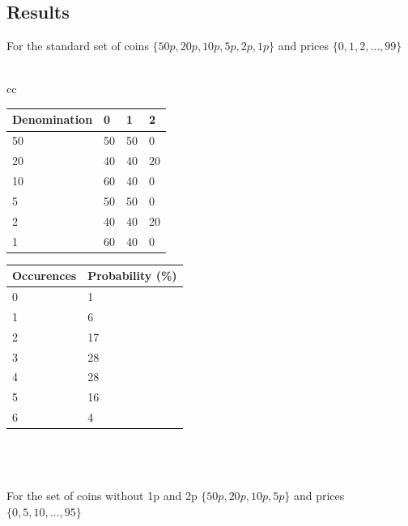 \documentclass{article}
\begin{document}
\subsection{Results}
For the standard set of coins $ \{50p, 20p, 10p, 5p, 2p, 1p \} $ and prices $ \{0, 1, 2, \ldots, 99 \} $
\\ \\
\begin{tabular}{cc}

    \begin{tabular}[t]{llll}
        Denomination & 0  & 1  & 2  \\
        \hline
        50           & 50 & 50 & 0  \\
        20           & 40 & 40 & 20 \\
        10           & 60 & 40 & 0  \\
        5            & 50 & 50 & 0  \\
        2            & 40 & 40 & 20 \\
        1            & 60 & 40 & 0  \\
        \hline
    \end{tabular}
    \: \: \:

    \begin{tabular}[t]{ll}
        Occurences & Probability (\%) \\
        \hline
        0          & 1                \\
        1          & 6                \\
        2          & 17               \\
        3          & 28               \\
        4          & 28               \\
        5          & 16               \\
        6          & 4                \\
        \hline
    \end{tabular}
\end{tabular}
\\ \\ \\
For the set of coins without 1p and 2p $ \{50p, 20p, 10p, 5p \} $ and prices $ \{ 0, 5, 10, \ldots, 95 \} $
\\ \\
\end{document}
